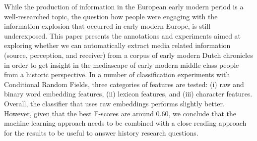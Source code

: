 While the production of information in the European early modern period is a well-researched topic, the question how people were engaging with the information explosion that occurred in early modern Europe, is still underexposed. This paper presents the annotations and experiments aimed at exploring whether we can automatically extract media related information (source, perception, and receiver) from a corpus of early modern Dutch chronicles in order to get insight in the mediascape of early modern middle class people from a historic perspective. In a number of classification experiments with Conditional Random Fields, three categories of features are tested: (i) raw and binary word embedding features, (ii) lexicon features, and (iii) character features. Overall, the classifier that uses raw embeddings performs slightly better. However, given that the best F-scores are around 0.60, we conclude that the machine learning approach needs to be combined with a close reading approach for the results to be useful to answer history research questions.
